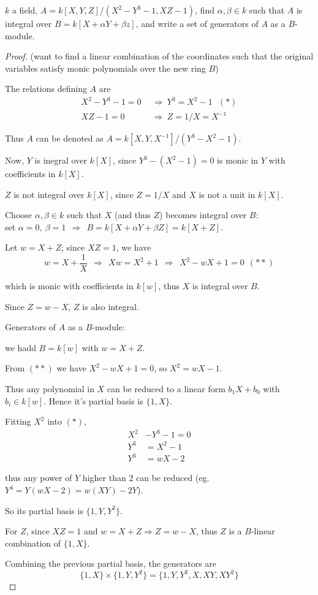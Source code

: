 \documentclass{article}
\theoremstyle{definition}
\newenvironment{ex}[1]
{\renewcommand\theinnerex{#1}\innerex}
{\endinnerex}
\begin{document}
\begin{ex}{R.4.9}
  $k$ a field, $A= k[X,Y,Z]/(X^2- Y^3 -1, XZ - 1)$, find $\alpha, \beta \in k$ such that $A$ is integral over $B = k[X + \alpha Y + \beta z]$, and write a set of generators of $A$ as a $B$-module.
\end{ex}
\begin{proof}
  (want to find a linear combination of the coordinates such that the original variables satisfy monic polynomials over the new ring $B$)

  The relations defining $A$ are
  \begin{align*}
    X^2-Y^3-1=0 ~~&\Longrightarrow~ Y^3 = X^2 -1 ~~~(*)\\
    XZ -1=0 ~~&\Longrightarrow~ Z= 1/X = X^{-1}
  \end{align*}

Thus $A$ can be denoted as $A = k[X,Y,X^{-1}]/(Y^3 - X^2 - 1)$.


Now, $Y$ is inegral over $k[X]$, since $Y^3 - (X^2 - 1) = 0$ is monic in $Y$ with coefficients in $k[X]$.

$Z$ is not integral over $k[X]$, since $Z=1/X$ and $X$ is not a unit in $k[X]$.

Choose $\alpha, \beta \in k$ such that $X$ (and thus $Z$) becomes integral over $B$:\\
set $\alpha=0,~\beta=1 ~~\Longrightarrow~~ B=k[X+\alpha Y + \beta Z]= k[X+Z]$.

Let $w=X+Z$; since $XZ=1$, we have
$$w=X+\frac{1}{X} ~~\Longrightarrow~~ Xw=X^2+1 ~~\Longrightarrow~~ X^2 -w X +1 = 0 ~~(**)$$

which is monic with coefficients in $k[w]$, thus $X$ is integral over $B$.

Since $Z=w-X$, $Z$ is also integral.

\vspace{0.4cm}
Generators of $A$ as a $B$-module:

we hadd $B=k[w]$ with $w=X+Z$.

From $(**)$ we have $X^2 - wX + 1=0$, so $X^2 = wX -1$.

Thus any polynomial in $X$ can be reduced to a linear form $b_1 X + b_0$ with $b_i \in k[w]$. Hence it's partial basis is $\{1, X\}$.

Fitting $X^2$ into $(*)$,
\begin{align*}
  X^2 &- Y^3 -1 =0\\
  Y^3 &= X^2-1\\
  Y^3 &= wX -2
\end{align*}

thus any power of $Y$ higher than $2$ can be reduced (eg. $Y^4 = Y(wX-2) = w(XY) - 2Y$).

So its partial basis is $\{1, Y, Y^2\}$.

For $Z$, since $XZ=1$ and $w=X+Z \Longrightarrow Z=w-X$, thus $Z$ is a $B$-linear combination of $\{1,X\}$.

\vspace{0.2cm}
Combining the previous partial basis, the generators are
$$\{ 1, X \} \times \{ 1,Y, Y^2 \} = \{ 1, Y, Y^2, X, XY, XY^2 \}$$

\end{proof}
\end{document}
